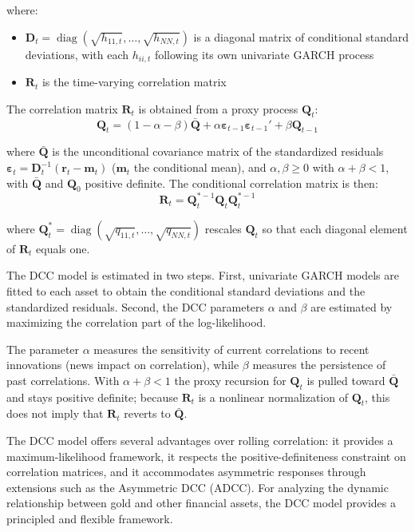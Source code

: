 where:
\begin{itemize}
    \item $\mathbf{D}_t = \operatorname{diag}(\sqrt{h_{11,t}}, \ldots, \sqrt{h_{NN,t}})$ is a diagonal matrix of conditional standard deviations, with each $h_{ii,t}$ following its own univariate GARCH process
    \item $\mathbf{R}_t$ is the time-varying correlation matrix
\end{itemize}

The correlation matrix $\mathbf{R}_t$ is obtained from a proxy process $\mathbf{Q}_t$:
$$\mathbf{Q}_t = (1 - \alpha - \beta)\bar{\mathbf{Q}} + \alpha \boldsymbol{\varepsilon}_{t-1}\boldsymbol{\varepsilon}_{t-1}' + \beta \mathbf{Q}_{t-1}$$

where $\bar{\mathbf{Q}}$ is the unconditional covariance matrix of the standardized residuals $\boldsymbol{\varepsilon}_t = \mathbf{D}_t^{-1}(\mathbf{r}_t-\mathbf{m}_t)$ ($\mathbf m_t$ the conditional mean), and $\alpha, \beta \geq 0$ with $\alpha + \beta < 1$, with $\bar{\mathbf Q}$ and $\mathbf Q_0$ positive definite. The conditional correlation matrix is then:
$$\mathbf{R}_t = \mathbf{Q}_t^{*-1} \mathbf{Q}_t \mathbf{Q}_t^{*-1}$$

where $\mathbf{Q}_t^* = \operatorname{diag}(\sqrt{q_{11,t}}, \ldots, \sqrt{q_{NN,t}})$ rescales $\mathbf{Q}_t$ so that each diagonal element of $\mathbf{R}_t$ equals one.

The DCC model is estimated in two steps. First, univariate GARCH models are fitted to each asset to obtain the conditional standard deviations and the standardized residuals. Second, the DCC parameters $\alpha$ and $\beta$ are estimated by maximizing the correlation part of the log-likelihood.

\begin{remark}
The parameter $\alpha$ measures the sensitivity of current correlations to recent innovations (news impact on correlation), while $\beta$ measures the persistence of past correlations. With $\alpha+\beta<1$ the proxy recursion for $\mathbf Q_t$ is pulled toward $\bar{\mathbf Q}$ and stays positive definite; because $\mathbf R_t$ is a nonlinear normalization of $\mathbf Q_t$, this does not imply that $\mathbf R_t$ reverts to $\bar{\mathbf Q}$.
\end{remark}

The DCC model offers several advantages over rolling correlation: it provides a maximum-likelihood framework, it respects the positive-definiteness constraint on correlation matrices, and it accommodates asymmetric responses through extensions such as the Asymmetric DCC (ADCC). For analyzing the dynamic relationship between gold and other financial assets, the DCC model provides a principled and flexible framework.



